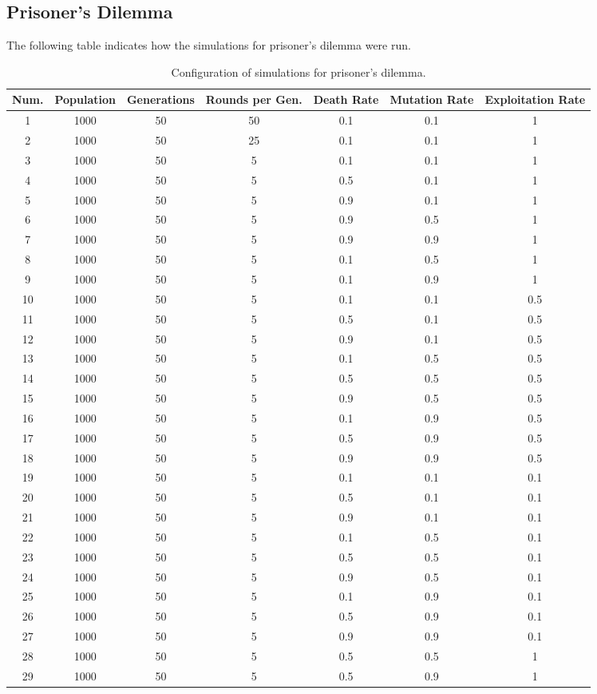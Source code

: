 \documentclass{book}
\begin{document}
\subsection{Prisoner's Dilemma}
The following table indicates how the simulations for prisoner's dilemma were run.
\begin{table}[H]
\begin{center}
\begin{tabular}{|c|c|c|c|c|c|c|}
\hline
Num. & Population & Generations& Rounds per Gen. & Death Rate & Mutation Rate & Exploitation Rate\\ 
\hline
1& 1000 & 50 & 50 & 0.1 & 0.1 & 1\\
\hline
2& 1000 & 50 & 25 & 0.1 & 0.1 & 1\\
\hline
3& 1000 & 50 & 5 & 0.1 & 0.1 & 1\\
\hline
4& 1000 & 50 & 5 & 0.5 & 0.1 & 1\\
\hline
5& 1000 & 50 & 5 & 0.9 & 0.1 & 1\\
\hline
6& 1000 & 50 & 5 & 0.9 & 0.5 & 1\\
\hline
7& 1000 & 50 & 5 & 0.9 & 0.9 & 1\\
\hline
8& 1000 & 50 & 5 & 0.1 & 0.5 & 1\\
\hline
9& 1000 & 50 & 5 & 0.1 & 0.9 & 1\\
\hline
10& 1000 & 50 & 5 & 0.1 & 0.1 & 0.5\\
\hline
11& 1000 & 50 & 5 & 0.5 & 0.1 & 0.5\\
\hline
12& 1000 & 50 & 5 & 0.9 & 0.1 & 0.5\\
\hline
13& 1000 & 50 & 5 & 0.1 & 0.5 & 0.5\\
\hline
14& 1000 & 50 & 5 & 0.5 & 0.5 & 0.5\\
\hline
15& 1000 & 50 & 5 & 0.9 & 0.5 & 0.5\\
\hline
16& 1000 & 50 & 5 & 0.1 & 0.9 & 0.5\\
\hline
17& 1000 & 50 & 5 & 0.5 & 0.9 & 0.5\\
\hline
18& 1000 & 50 & 5 & 0.9 & 0.9 & 0.5\\
\hline
19& 1000 & 50 & 5 & 0.1 & 0.1 & 0.1\\
\hline
20& 1000 & 50 & 5 & 0.5 & 0.1 & 0.1\\
\hline
21& 1000 & 50 & 5 & 0.9 & 0.1 & 0.1\\
\hline
22& 1000 & 50 & 5 & 0.1 & 0.5 & 0.1\\
\hline
23& 1000 & 50 & 5 & 0.5 & 0.5 & 0.1\\
\hline
24& 1000 & 50 & 5 & 0.9 & 0.5 & 0.1\\
\hline
25& 1000 & 50 & 5 & 0.1 & 0.9& 0.1\\
\hline
26& 1000 & 50 & 5 & 0.5 & 0.9 & 0.1\\
\hline
27& 1000 & 50 & 5 & 0.9 & 0.9 & 0.1\\
\hline
28& 1000 & 50 & 5 & 0.5 & 0.5 & 1\\
\hline
29& 1000 & 50 & 5 & 0.5 & 0.9 & 1\\
\hline

\end{tabular}
\end{center}
\caption{Configuration of simulations for prisoner's dilemma.}
\label{tab:simpdtag}
\end{table}
\end{document}
